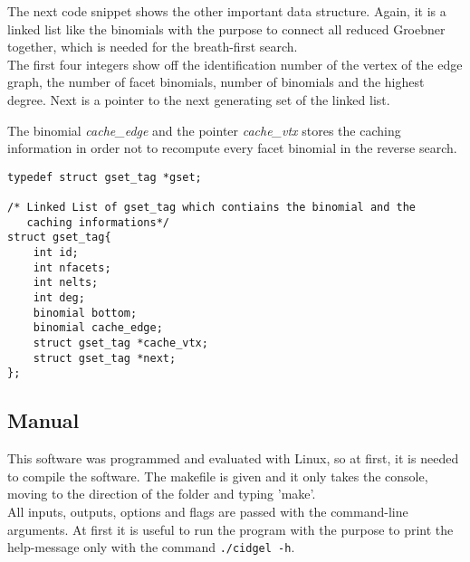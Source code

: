 The next code snippet shows the other important data structure. Again, it is a linked list like the binomials with the purpose to connect all reduced Groebner together, which is needed for the breath-first search.\\

The first four integers show off the identification number of the vertex of the edge graph, the number of facet binomials, number of binomials and the highest degree. Next is a pointer to the next generating set of the linked list.

The binomial \emph{cache\_edge} and the pointer \emph{cache\_vtx} stores the caching information in order not to recompute every facet binomial in the reverse search. 

\begin{lstlisting} 
typedef struct gset_tag *gset;

/* Linked List of gset_tag which contiains the binomial and the
   caching informations*/
struct gset_tag{
    int id;
    int nfacets;
    int nelts;
    int deg;
    binomial bottom;
    binomial cache_edge;
    struct gset_tag *cache_vtx;
    struct gset_tag *next;
};

\end{lstlisting}

 


 


\subsection{Manual}
\label{subsec:manual}
This software was programmed and evaluated with Linux, so at first, it is needed to compile the software. The makefile is given and it only takes the console, moving to the direction of the folder and typing 'make'. \\
All inputs, outputs, options and flags are passed with the command-line arguments. At first it is useful to run the program with the purpose to print the help-message only with the command
\texttt{./cidgel -h}.

